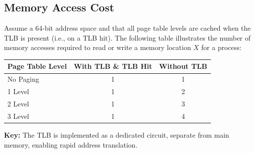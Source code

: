 \subsection{Memory Access Cost}
Assume a 64-bit address space and that all page table levels are cached when the TLB is present (i.e., on a TLB hit). The following table illustrates the number of memory accesses required to read or write a memory location \(X\) for a process:

\begin{center}
\begin{tabular}{l|c|c}
    \toprule
    \textbf{Page Table Level} & \textbf{With TLB \& TLB Hit} & \textbf{Without TLB} \\
    \midrule
    No Paging & 1 & 1 \\
    1 Level   & 1 & 2 \\
    2 Level   & 1 & 3 \\
    3 Level   & 1 & 4 \\
    \bottomrule
\end{tabular}
\end{center}

\textbf{Key:} The TLB is implemented as a dedicated circuit, separate from main memory, enabling rapid address translation.
\newpage
